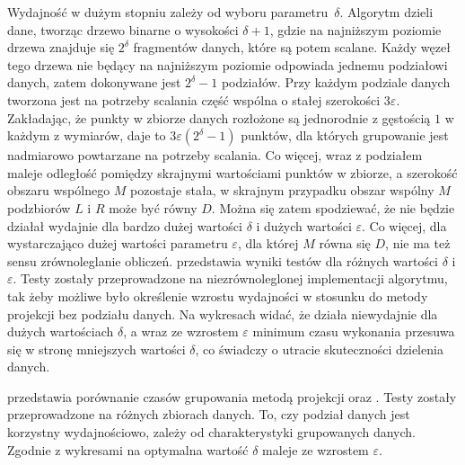 
Wydajność  w dużym stopniu zależy od wyboru \mbox{parametru $ \delta $}. Algorytm dzieli dane, tworząc drzewo binarne o wysokości $ \delta + 1 $, gdzie na najniższym poziomie drzewa znajduje się $ 2^\delta $ fragmentów danych, które są potem scalane. Każdy węzeł tego drzewa nie będący na najniższym poziomie odpowiada jednemu podziałowi danych, zatem dokonywane jest $ 2^\delta - 1 $ podziałów. Przy każdym podziale danych tworzona jest na potrzeby scalania część wspólna o stałej szerokości $ 3\varepsilon $. Zakładając, że punkty w zbiorze danych rozłożone są jednorodnie z gęstością $ 1 $ w każdym z wymiarów, daje to $ 3\varepsilon(2^\delta - 1) $ punktów, dla których grupowanie jest nadmiarowo powtarzane na potrzeby scalania. Co więcej, wraz z podziałem maleje odległość pomiędzy skrajnymi wartościami punktów w zbiorze, a szerokość obszaru wspólnego $ M $ pozostaje stała, w skrajnym przypadku obszar wspólny $ M $ podzbiorów $ L $ i $ R $ może być równy $ D $. Można się zatem spodziewać, że  nie będzie działał wydajnie dla bardzo dużej wartości $ \delta $ i dużych wartości $ \varepsilon $. Co więcej, dla wystarczająco dużej wartości parametru $ \varepsilon $, dla której $ M $ równa się $ D $, nie ma też sensu zrównoleglanie obliczeń.  przedstawia wyniki testów  dla różnych wartości $ \delta $ i $ \varepsilon $. Testy zostały przeprowadzone na niezrównoleglonej implementacji algorytmu, tak żeby możliwe było określenie wzrostu wydajności w stosunku do metody projekcji bez podziału danych. Na wykresach widać, że  działa niewydajnie dla dużych wartościach $ \delta $, a wraz ze wzrostem $ \varepsilon $ minimum czasu wykonania przesuwa się w stronę mniejszych wartości $ \delta $, co świadczy o utracie skuteczności dzielenia danych. \par
{} przedstawia porównanie czasów grupowania metodą projekcji oraz . Testy zostały przeprowadzone na różnych zbiorach danych. To, czy podział danych jest korzystny wydajnościowo, zależy od charakterystyki grupowanych danych. Zgodnie z wykresami na  optymalna wartość $ \delta $ maleje ze wzrostem $ \varepsilon $.
